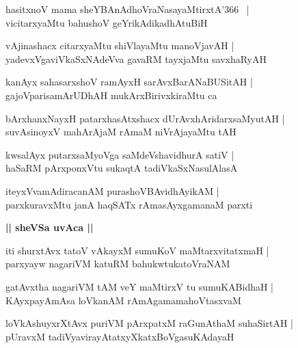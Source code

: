 \documentclass[twoside,12pt,openright]{book}
\newcounter{shloka}[chapter]
\def\uvaca#1{\centerline{{\large\textbf{#1}}}}
\begin{document}
\begin{shloka}%
hasitxnoV mama sheYBAnAdhoVraNasayaMtirxtA\char'366 ~|\\
vicitarxyaMtu bahushoV geYrikAdikadhAtuBiH
\end{shloka}

\begin{shloka}%
vAjinashacx citarxyaMtu shiVlayaMtu manoVjavAH |\\
yadevxVgaviVkaSxNAdeVva gavaRM tayxjaMtu savxhaRyAH
\end{shloka}

\begin{shloka}%
kanAyx sahasarxshoV ramAyxH sarAvxBarANaBUSitAH |\\
gajoVparisamArUDhAH mukArxBirivxkiraMtu ca 
\end{shloka}

\begin{shloka}%
bArxhanxNayxH patarxhasAtxshacx dUrAvxhAridarxsaMyutAH |\\
suvAsinoyxV mahArAjaM rAmaM niVrAjayaMtu tAH
\end{shloka}

\begin{shloka}%
kwsalAyx putarxsaMyoVga saMdeVshavidhurA satiV |\\
haSaRM  pArxponxVtu sukaqtA tadiVkaSxNasulAlasA 
\end{shloka}

\begin{shloka}%
iteyxVvamAdiracanAM purashoVBAvidhAyikAM |\\
parxkuravxMtu janA haqSATx rAmasAyxgamanaM parxti
\end{shloka}

\uvaca{|| sheVSa uvAca ||}

\begin{shloka}%
iti shurxtAvx tatoV vAkayxM sumuKoV maMtarxvitatxmaH |\\
parxyayw nagariVM katuRM bahukwtukatoVraNAM 
\end{shloka}

\begin{shloka}%
gatAvxtha nagariVM tAM veY maMtirxV tu sumuKABidhaH |\\
KAyxpayAmAsa loVkanAM rAmAgamamahoVtasxvaM 
\end{shloka}

\begin{shloka}%
loVkAshuyxrXtAvx puriVM pArxpatxM raGunAthaM suhaSirtAH |\\
pUravxM tadiVyavirayAtatxyXkatxBoVgasuKAdayaH 
\end{shloka}
\end{document}
